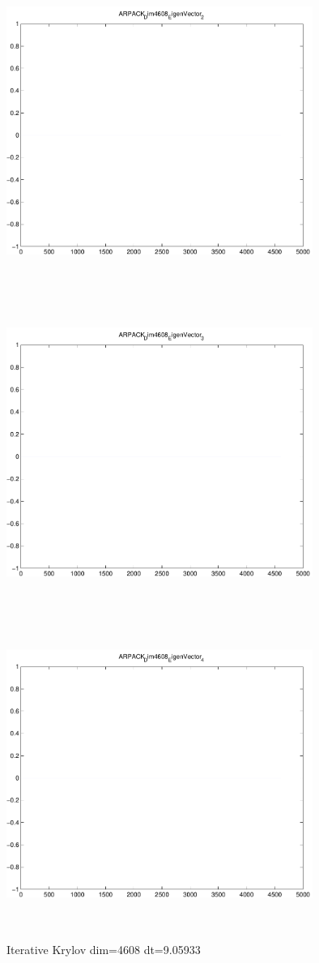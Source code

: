 \documentclass[9pt]{article}
\theoremstyle{plain}
\theoremstyle{definition}
\theoremstyle{remark}
\numberwithin{equation}{section}
\begin{document}
\includegraphics[width=10.0cm,height=10.0cm]{ARPACK_Dim4608_EigenVector_2.pdf}

\includegraphics[width=10.0cm,height=10.0cm]{ARPACK_Dim4608_EigenVector_3.pdf}

\includegraphics[width=10.0cm,height=10.0cm]{ARPACK_Dim4608_EigenVector_4.pdf}

Iterative Krylov dim=4608 dt=9.05933
\end{document}
